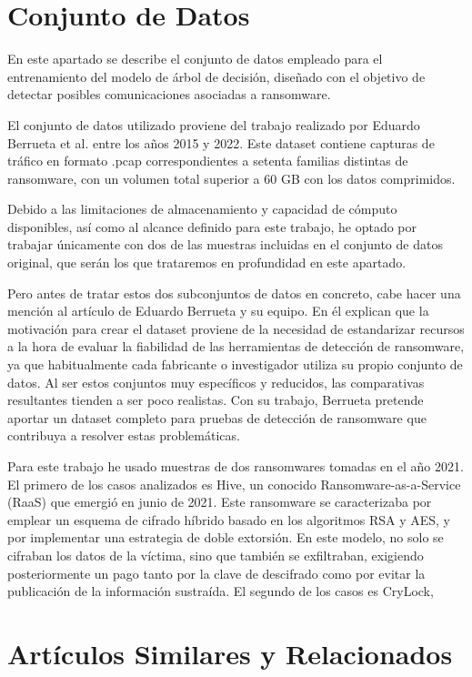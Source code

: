 \section{Conjunto de Datos}
En este apartado se describe el conjunto de datos empleado para el entrenamiento del modelo de árbol de decisión, diseñado con el objetivo de detectar posibles comunicaciones asociadas a ransomware.

El conjunto de datos utilizado proviene del trabajo realizado por Eduardo Berrueta et al. entre los años 2015 y 2022\cite{qnyn-q136-20}. Este dataset contiene capturas de tráfico en formato .pcap correspondientes a setenta familias distintas de ransomware, con un volumen total superior a 60 GB con los datos comprimidos.

Debido a las limitaciones de almacenamiento y capacidad de cómputo disponibles, así como al alcance definido para este trabajo, he optado por trabajar únicamente con dos de las muestras incluidas en el conjunto de datos original, que serán los que trataremos en profundidad en este apartado.

Pero antes de tratar estos dos subconjuntos de datos en concreto, cabe hacer una mención al artículo de Eduardo Berrueta y su equipo\cite{9050526}. En él explican que la motivación para crear el dataset proviene de la necesidad de estandarizar recursos a la hora de evaluar la fiabilidad de las herramientas de detección de ransomware, ya que habitualmente cada fabricante o investigador utiliza su propio conjunto de datos. Al ser estos conjuntos muy específicos y reducidos, las comparativas resultantes tienden a ser poco realistas. Con su trabajo, Berrueta pretende aportar un dataset completo para pruebas de detección de ransomware que contribuya a resolver estas problemáticas.

Para este trabajo he usado muestras de dos ransomwares tomadas en el año 2021. El primero de los casos analizados es Hive, un conocido Ransomware-as-a-Service (RaaS) que emergió en junio de 2021. Este ransomware se caracterizaba por emplear un esquema de cifrado híbrido basado en los algoritmos RSA y AES, y por implementar una estrategia de doble extorsión. En este modelo, no solo se cifraban los datos de la víctima, sino que también se exfiltraban, exigiendo posteriormente un pago tanto por la clave de descifrado como por evitar la publicación de la información sustraída\cite{KIM2022103387}. El segundo de los casos es CryLock, 

\section{Artículos Similares y Relacionados}
